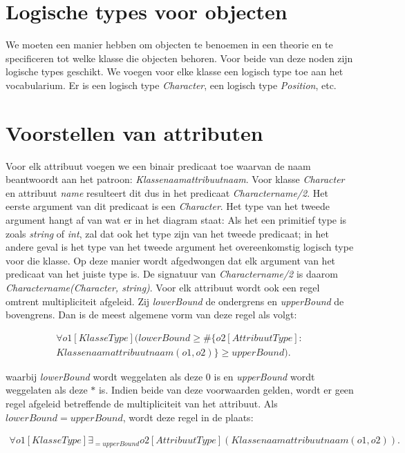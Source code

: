 \section{Logische types voor objecten}
We moeten een manier hebben om objecten te benoemen in een theorie en te specificeren tot welke klasse die objecten behoren. Voor beide van deze noden zijn logische types geschikt. We voegen voor elke klasse een logisch type toe aan het vocabularium. Er is een logisch type \textit{Character}, een logisch type \textit{Position}, etc.

\section{Voorstellen van attributen}
Voor elk attribuut voegen we een binair predicaat toe waarvan de naam beantwoordt aan het patroon: \textit{Klassenaamattribuutnaam}. Voor klasse \textit{Character} en attribuut \textit{name} resulteert dit dus in het predicaat \textit{Charactername/2}. Het eerste argument van dit predicaat is een \textit{Character}. Het type van het tweede argument hangt af van wat er in het diagram staat: Als het een primitief type is zoals \textit{string} of \textit{int}, zal dat ook het type zijn van het tweede predicaat; in het andere geval is het type van het tweede argument het overeenkomstig logisch type voor die klasse. Op deze manier wordt afgedwongen dat elk argument van het predicaat van het juiste type is.
De signatuur van \textit{Charactername/2} is daarom \textit{Charactername(Character, string)}.
Voor elk attribuut wordt ook een regel omtrent multipliciteit afgeleid. Zij \textit{lowerBound} de ondergrens en \textit{upperBound} de bovengrens. Dan is de meest algemene vorm van deze regel als volgt:
	
\begin{align*}
	\forall{o1}[KlasseType](lowerBound \geq \#\{o2 [AttribuutType] : \\ Klassenaamattribuutnaam(o1,o2)\} \geq upperBound).
\end{align*}
	
waarbij \textit{lowerBound} wordt weggelaten als deze $0$ is en \textit{upperBound} wordt weggelaten als deze $*$ is. Indien beide van deze voorwaarden gelden, wordt er geen regel afgeleid betreffende de multipliciteit van het attribuut. Als $lowerBound = upperBound$, wordt deze regel in de plaats:
	
\begin{align*}
	\forall{o1}[KlasseType] \exists_{=upperBound}{o2}[AttribuutType](Klassenaamattribuutnaam(o1,o2)).
\end{align*}
	
